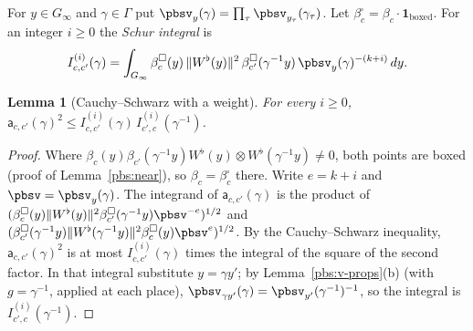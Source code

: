\documentclass[10pt]{amsart}
\newtheorem{lemma}[theorem]{Lemma}
\theoremstyle{definition}
\theoremstyle{remark}
\begin{document}
For $y\in G_\infty$ and $\gamma\in\Gamma$ put $\pbsv_y(\gamma)=\prod_\tau\pbsv_{y_\tau}(\gamma_\tau)$. Let
$\beta^\square_c=\beta_c\cdot\mathbf 1_{\text{boxed}}$. For an integer $i\ge0$ the \emph{Schur
integral} is
\[
I^{(i)}_{c,c'}(\gamma)=\int_{G_\infty}\beta^\square_c(y)\,\|W^\flat(y)\|^2\,\beta^\square_{c'}(
\gamma^{-1}y)\,\pbsv_y(\gamma)^{-(k+i)}\,dy .
\]

\begin{lemma}[Cauchy--Schwarz with a weight]\label{pbs:cs}
For every $i\ge0$, $\mathsf a_{c,c'}(\gamma)^2\le I^{(i)}_{c,c'}(\gamma)\,I^{(i)}_{c',c}(\gamma^{-1})$.
\end{lemma}
\begin{proof}
Where $\beta_c(y)\beta_{c'}(\gamma^{-1}y)W^\flat(y)\otimes W^\flat(\gamma^{-1}y)\ne0$, both points are
boxed (proof of Lemma~\ref{pbs:near}), so $\beta_c=\beta_c^\square$ there. Write $e=k+i$ and
$\pbsv=\pbsv_y(\gamma)$. The integrand of $\mathsf a_{c,c'}(\gamma)$ is the product of $(\beta^\square_c
(y)\|W^\flat(y)\|^2\beta^\square_{c'}(\gamma^{-1}y)\pbsv^{-e})^{1/2}$ and $(\beta^\square_{c'}(\gamma^{-1}y)
\|W^\flat(\gamma^{-1}y)\|^2\beta^\square_c(y)\pbsv^{e})^{1/2}$. By the Cauchy--Schwarz inequality,
$\mathsf a_{c,c'}(\gamma)^2$ is at most $I^{(i)}_{c,c'}(\gamma)$ times the integral of the square of
the second factor. In that integral substitute $y=\gamma y'$; by Lemma~\ref{pbs:v-props}(b) (with
$g=\gamma^{-1}$, applied at each place), $\pbsv_{\gamma y'}(\gamma)=\pbsv_{y'}(\gamma^{-1})^{-1}$, so the
integral is $I^{(i)}_{c',c}(\gamma^{-1})$.
\end{proof}
\end{document}
